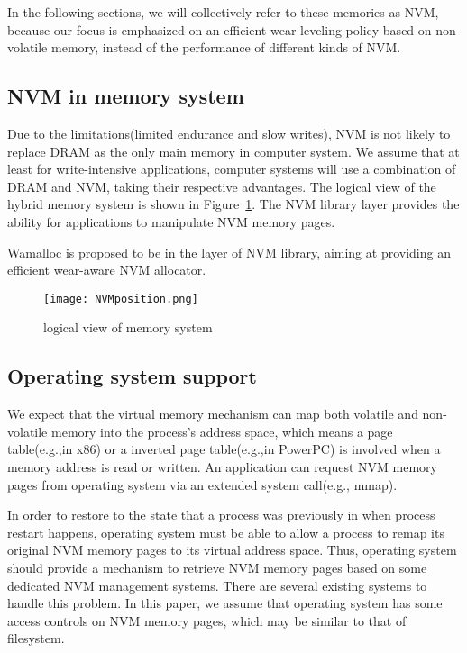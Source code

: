 \documentclass[10pt, conference, compsocconf]{IEEEtran}
\begin{document}
In the following sections, we will collectively refer to these memories as NVM, 
because our focus is emphasized on an efficient wear-leveling policy based on non-volatile memory,
instead of the performance of different kinds of NVM.

\subsection{NVM in memory system}

Due to the limitations(limited endurance and slow writes),
NVM is not likely to replace DRAM as the only main memory in computer system.
We assume that at least for write-intensive applications,
computer systems will use a combination of DRAM and NVM, taking their respective advantages.
The logical view of the hybrid memory system is shown in Figure~\ref{fig:NVMposition}.
The NVM library layer provides the ability for applications to manipulate NVM memory pages.

Wamalloc is proposed to be in the layer of NVM library, aiming at providing an efficient wear-aware NVM allocator.

\begin{figure}[h]
\centering
\texttt{[image: NVMposition.png]}
\caption{logical view of memory system}
\label{fig:NVMposition}
\end{figure}

\subsection{Operating system support}

We expect that the virtual memory mechanism can map both volatile and non-volatile memory into the process's address space,
which means a page table(e.g.,in x86) or a inverted page table(e.g.,in PowerPC) is involved when a memory address is read or written.
An application can request NVM memory pages from operating system via an extended system call(e.g., mmap).

In order to restore to the state that a process was previously in when process restart happens, 
operating system must be able to allow a process to remap its original NVM memory pages to its virtual address space.
Thus, operating system should provide a mechanism to retrieve NVM memory pages based on some dedicated NVM management systems.
There are several existing systems to handle this problem\cite{coburn2011nv, satyanarayanan1994lightweight, volos2011mnemosyne}.
In this paper, we assume that operating system has some access controls on NVM memory pages, 
which may be similar to that of filesystem.
\end{document}
